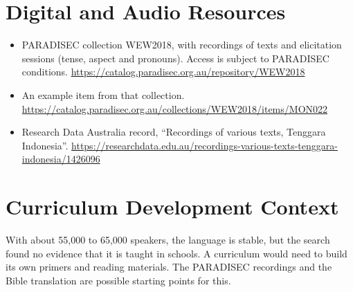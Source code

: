 \documentclass[12pt]{article}
\begin{document}
\section{Digital and Audio Resources}
\begin{itemize}
\item PARADISEC collection WEW2018, with recordings of texts and elicitation sessions (tense, aspect and pronouns). Access is subject to PARADISEC conditions. \url{https://catalog.paradisec.org.au/repository/WEW2018}
\item An example item from that collection. \url{https://catalog.paradisec.org.au/collections/WEW2018/items/MON022}
\item Research Data Australia record, ``Recordings of various texts, Tenggara Indonesia''. \url{https://researchdata.edu.au/recordings-various-texts-tenggara-indonesia/1426096}
\end{itemize}

\section{Curriculum Development Context}
With about 55,000 to 65,000 speakers, the language is stable, but the search found no evidence that it is taught in schools. A curriculum would need to build its own primers and reading materials. The PARADISEC recordings and the Bible translation are possible starting points for this.
\end{document}
